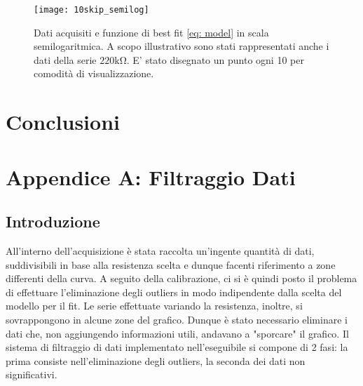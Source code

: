 \documentclass{article}[a4paper, oneside, 11pt]
\begin{document}
\begin{figure}[!htp]
	\centering 
		\texttt{[image: 10skip\_semilog]}
	\caption{Dati acquisiti e funzione di best fit \eqref{eq: model} in 
	scala semilogaritmica. A scopo illustrativo sono stati rappresentati anche
	i dati della serie $220\si{\kohm}$. E' stato disegnato un punto ogni 10
	per comodit\`a di visualizzazione. \label{fig: sck_log}}
\end{figure}

\section{Conclusioni}

\section{Appendice A: Filtraggio Dati}\label{app: A}
\subsection{Introduzione}
All'interno dell'acquisizione \`e stata raccolta un'ingente quantit\`a di dati,
suddivisibili in base alla resistenza scelta e dunque facenti riferimento
a zone differenti della curva. A seguito della calibrazione, ci si \`e quindi
posto il problema di effettuare l'eliminazione degli outliers in modo
indipendente dalla scelta del modello per il fit. Le serie effettuate
variando la resistenza, inoltre, si sovrappongono in alcune zone del
grafico. Dunque \`e stato necessario eliminare i dati che, non aggiungendo
informazioni utili, andavano a "sporcare" il grafico. Il sistema di filtraggio
di dati implementato nell'eseguibile si compone di 2 fasi:
la prima consiste nell'eliminazione degli outliers, la seconda dei dati non
significativi.
\end{document}
